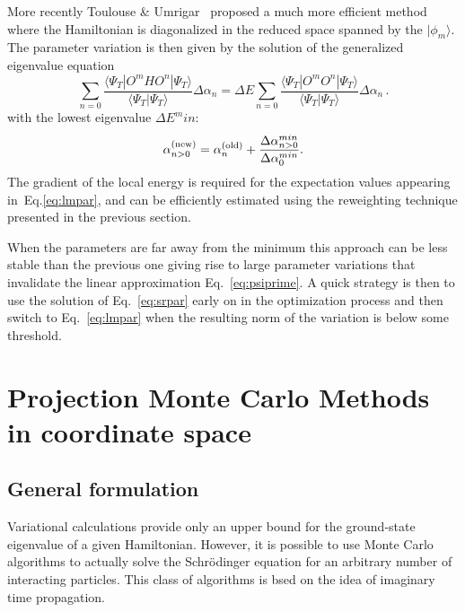 
More recently Toulouse \& Umrigar~\cite{Toulouse07} proposed a much more efficient method
where the Hamiltonian is diagonalized in the reduced space spanned by the $|\phi_m\rangle$.
The parameter variation is then given by the solution of the generalized eigenvalue equation
\begin{equation}
\label{eq:lmpar}
\sum_{n=0}\frac{\langle \Psi_T |O^m H O^n|\Psi_T\rangle}
{\langle \Psi_T |\Psi_T\rangle}\Delta \alpha_n
= \Delta E \sum_{n=0} \frac{\langle \Psi_T |O^m O^n |\Psi_T\rangle}
{\langle \Psi_T |\Psi_T\rangle} \Delta \alpha_n\,.
\end{equation}
with the lowest eigenvalue $\Delta E^min$:
\begin{equation}
\alpha^{(\rm new)}_{n>0} =
\alpha^{(\rm old)}_n + \frac{\Delta \alpha^{min}_{n>0}}{\Delta \alpha^{min}_0} .
\end{equation}
The gradient of the local energy is required for the expectation values 
appearing in~Eq.\eqref{eq:lmpar}, and can be efficiently estimated using the
reweighting technique presented in the previous section.

When the parameters are far away from the minimum this approach can be less stable 
than the previous one giving rise to large parameter variations that
invalidate the linear approximation Eq.~\ref{eq:psiprime}. A quick strategy is then to use 
the solution of Eq.~\eqref{eq:srpar} early on in the optimization process and then switch to
Eq.~\eqref{eq:lmpar} when the resulting norm of the variation is below some threshold.

\section{Projection Monte Carlo Methods in coordinate space}
\subsection{General formulation}
\label{sec:generaldmc}
Variational calculations provide only an upper bound for the ground-state eigenvalue of a 
given Hamiltonian. However, it is possible to use Monte Carlo algorithms to actually solve
the Schr\"odinger equation for an arbitrary number of interacting particles. This class of algorithms is bsed on the idea of imaginary time propagation.

